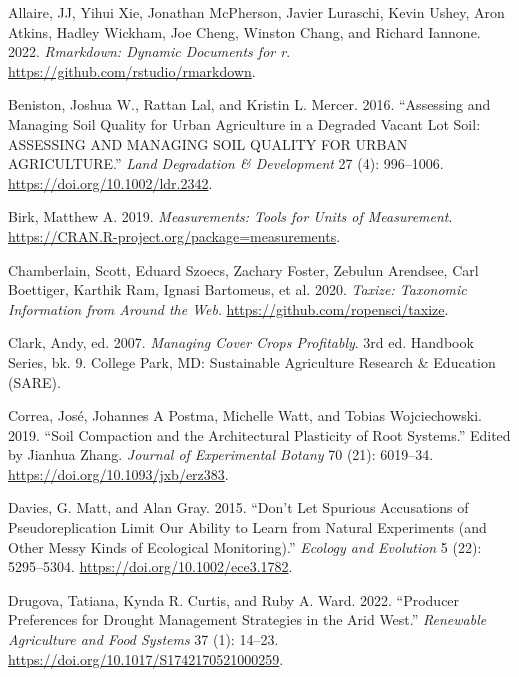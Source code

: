 \documentclass[
]{article}
\newlength{\cslhangindent}
\newlength{\cslentryspacingunit} %
\newenvironment{CSLReferences}[2] %
 {%
  \setlength{\parindent}{0pt}
  \ifodd #1
  \let\oldpar\par
  \def\par{\hangindent=\cslhangindent\oldpar}
  \fi
  \setlength{\parskip}{#2\cslentryspacingunit}
 }%
 {}
\begin{document}
\hypertarget{refs}{}
\begin{CSLReferences}{1}{0}
\leavevmode{}%
Allaire, JJ, Yihui Xie, Jonathan McPherson, Javier Luraschi, Kevin Ushey, Aron Atkins, Hadley Wickham, Joe Cheng, Winston Chang, and Richard Iannone. 2022. \emph{Rmarkdown: Dynamic Documents for r}. \url{https://github.com/rstudio/rmarkdown}.

\leavevmode{}%
Beniston, Joshua W., Rattan Lal, and Kristin L. Mercer. 2016. {``Assessing and {Managing Soil Quality} for {Urban Agriculture} in a {Degraded Vacant Lot Soil}: {ASSESSING AND MANAGING SOIL QUALITY FOR URBAN AGRICULTURE}.''} \emph{Land Degradation \& Development} 27 (4): 996--1006. \url{https://doi.org/10.1002/ldr.2342}.

\leavevmode{}%
Birk, Matthew A. 2019. \emph{Measurements: Tools for Units of Measurement}. \url{https://CRAN.R-project.org/package=measurements}.

\leavevmode{}%
Chamberlain, Scott, Eduard Szoecs, Zachary Foster, Zebulun Arendsee, Carl Boettiger, Karthik Ram, Ignasi Bartomeus, et al. 2020. \emph{Taxize: Taxonomic Information from Around the Web}. \url{https://github.com/ropensci/taxize}.

\leavevmode{}%
Clark, Andy, ed. 2007. \emph{Managing Cover Crops Profitably}. 3rd ed. Handbook Series, bk. 9. {College Park, MD}: {Sustainable Agriculture Research \& Education (SARE)}.

\leavevmode{}%
Correa, José, Johannes A Postma, Michelle Watt, and Tobias Wojciechowski. 2019. {``Soil Compaction and the Architectural Plasticity of Root Systems.''} Edited by Jianhua Zhang. \emph{Journal of Experimental Botany} 70 (21): 6019--34. \url{https://doi.org/10.1093/jxb/erz383}.

\leavevmode{}%
Davies, G. Matt, and Alan Gray. 2015. {``Don't Let Spurious Accusations of Pseudoreplication Limit Our Ability to Learn from Natural Experiments (and Other Messy Kinds of Ecological Monitoring).''} \emph{Ecology and Evolution} 5 (22): 5295--5304. \url{https://doi.org/10.1002/ece3.1782}.

\leavevmode{}%
Drugova, Tatiana, Kynda R. Curtis, and Ruby A. Ward. 2022. {``Producer Preferences for Drought Management Strategies in the Arid West.''} \emph{Renewable Agriculture and Food Systems} 37 (1): 14--23. \url{https://doi.org/10.1017/S1742170521000259}.


\end{CSLReferences}
\end{document}
